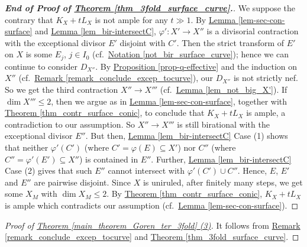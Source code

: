 \begin{proof}[\textup{\textbf{End of Proof of {\hyperref[thm_3fold_surface_curve]{Theorem \ref*{thm_3fold_surface_curve}}}.}}]
We suppose the contrary that $K_X+tL_X$ is not ample for any $t\gg 1$. 
By {\hyperref[lem-sec-con-surface]{Lemma \ref*{lem-sec-con-surface}}}
 and {\hyperref[lem_bir-intersectC]{Lemma \ref*{lem_bir-intersectC}}}, 
 $\varphi':X'\to X''$ is a divisorial contraction with the exceptional divisor $E'$  disjoint with $C'$.
Then the strict transform of $E'$ on $X$ is some $E_j$, $j\in I_0$ (cf.~{\hyperref[not_bir_surface_curve]{Notation  \ref*{not_bir_surface_curve}}}); hence we can continue to consider $D_{X''}$.
By {\hyperref[prop-q-effective]{Proposition  \ref*{prop-q-effective}}} and the induction  on $X''$ (cf.~{\hyperref[remark_conclude_excep_tocurve]{Remark    \ref*{remark_conclude_excep_tocurve}}}),  our $D_{X''}$ is  not strictly nef. 
So we get the third  contraction $X''\to X'''$ (cf.~{\hyperref[lem_not_big_X']{Lemma \ref*{lem_not_big_X'}}}). 
If $\dim X'''\leqslant 2$, then we  argue as in {\hyperref[lem-sec-con-surface]{Lemma \ref*{lem-sec-con-surface}}}, together with {\hyperref[thm_contr_surface_conic]{Theorem    \ref*{thm_contr_surface_conic}}}, to conclude that $K_X+tL_X$ is ample, a contradiction to our assumption.   
So $X''\to X'''$ is still birational with the exceptional divisor $E''$. 
But then, {\hyperref[lem_bir-intersectC]{Lemma \ref*{lem_bir-intersectC}}} Case (1) shows that neither $\varphi'(C')$ (where $C'=\varphi(E)\subseteq X'$) nor $C''$ (where $C''=\varphi'(E')\subseteq X''$) is contained in $E''$.
Further,  {\hyperref[lem_bir-intersectC]{Lemma \ref*{lem_bir-intersectC}}} Case (2) gives that
 such $E''$ cannot intersect with  $\varphi'(C')\cup C''$. %
Hence,  $E$, $E'$ and $E''$ are pairwise disjoint. 
Since  $X$ is uniruled, after finitely many steps, we get some $X_M$ with $\dim X_M\leqslant 2$. 
By {\hyperref[thm_contr_surface_conic]{Theorem    \ref*{thm_contr_surface_conic}}}, $K_X+tL_X$ is ample which contradicts our assumption (cf.~{\hyperref[lem-sec-con-surface]{Lemma \ref*{lem-sec-con-surface}}}).
\end{proof}




\begin{proof}[Proof of {\hyperref[main_theorem_Goren_ter_3fold]{Theorem   \ref*{main_theorem_Goren_ter_3fold} (3)}}]
It follows  from {\hyperref[remark_conclude_excep_tocurve]{Remark    \ref*{remark_conclude_excep_tocurve}}} and 	{\hyperref[thm_3fold_surface_curve]{Theorem \ref*{thm_3fold_surface_curve}}}.
\end{proof}



